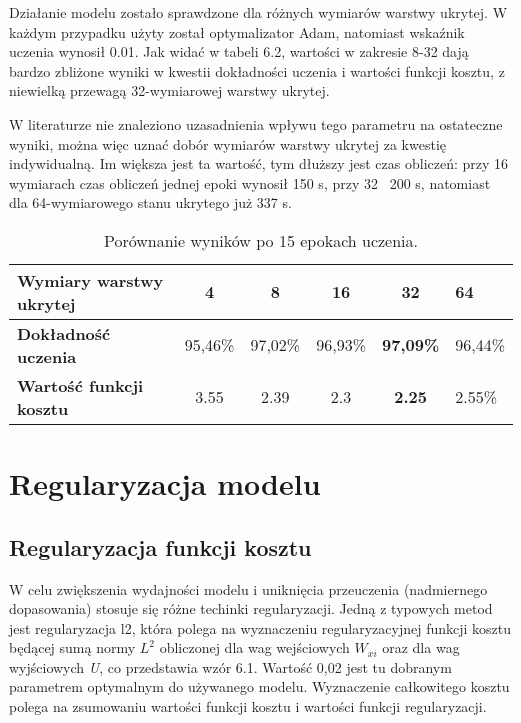 Działanie modelu zostało sprawdzone dla różnych wymiarów warstwy ukrytej. W każdym przypadku użyty został optymalizator Adam, natomiast wskaźnik uczenia wynosił 0.01. Jak widać w tabeli 6.2, wartości w zakresie 8-32 dają bardzo zbliżone wyniki w kwestii dokładności uczenia i wartości funkcji kosztu, z niewielką przewagą 32-wymiarowej warstwy ukrytej.

W literaturze nie znaleziono uzasadnienia wpływu tego parametru na ostateczne wyniki, można więc uznać dobór wymiarów warstwy ukrytej za kwestię indywidualną. Im większa jest ta wartość, tym dłuższy jest czas obliczeń: przy 16 wymiarach czas obliczeń jednej epoki wynosił 150 s, przy 32 \textendash \ 200 s, natomiast dla 64-wymiarowego stanu ukrytego już 337 s.
\begin{table}[H]
\centering
\begin{tabular}{|l|c|c|c|c|l|}
\hline
\textbf{Wymiary warstwy ukrytej}         & 4       & 8       & 16      & 32      & 64  \\ \hline
\textbf{Dokładność uczenia}     & 95,46\% & 97,02\% & 96,93\% & \textbf{97,09\%} & 96,44\% \\ \hline
\textbf{Wartość funkcji kosztu} & 3.55  & 2.39  & 2.3   & \textbf{2.25}  & 2.55\% \\ \hline
\end{tabular}%

\caption{Porównanie wyników po 15 epokach uczenia.}
\label{table:bf-sa}
\end{table}

\section{Regularyzacja modelu}


\label{cha:regulacja}
\subsection{Regularyzacja funkcji kosztu}
W celu zwiększenia wydajności modelu i uniknięcia przeuczenia (nadmiernego dopasowania) stosuje się różne techinki regularyzacji. Jedną z typowych metod jest regularyzacja l2, która polega na wyznaczeniu regularyzacyjnej funkcji kosztu będącej sumą normy $L^2$ obliczonej dla wag wejściowych \textit{$W_{xi}$} oraz dla wag wyjściowych \textit{U}, co przedstawia wzór 6.1. Wartość 0,02 jest tu dobranym parametrem optymalnym do używanego modelu. Wyznaczenie całkowitego kosztu polega na zsumowaniu wartości funkcji kosztu i wartości funkcji regularyzacji.


